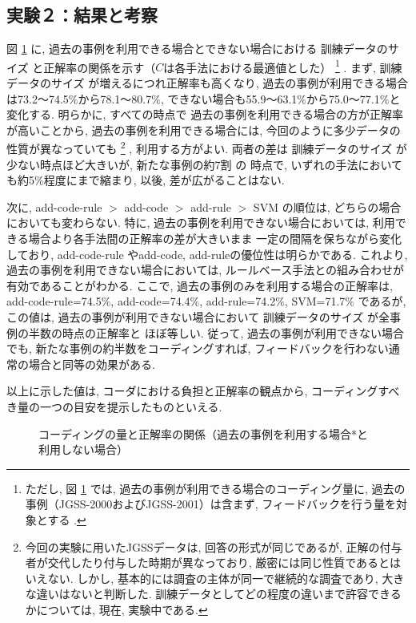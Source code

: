 \documentclass{nlp}
\begin{document}
\subsection{実験２：結果と考察} 
図
\ref{figure00010202}
に, 
過去の事例を利用できる場合とできない場合における 
訓練データのサイズ
と正解率の関係を示す（$C$は各手法における最適値とした）
\footnote{ただし, 
図
\ref{figure00010202}
では, 
過去の事例が利用できる場合のコーディング量に, 
過去の事例（JGSS-2000およびJGSS-2001）は含まず, 
フィードバックを行う量を対象とする
. }
. 
まず, 
訓練データのサイズ
が増えるにつれ正解率も高くなり, 
過去の事例が利用できる場合は73.2〜74.5$\%$から78.1〜80.7$\%$, 
できない場合も55.9〜63.1$\%$から75.0〜77.1$\%$と変化する. 
明らかに, すべての時点で
過去の事例を利用できる場合の方が正解率が高いことから, 
過去の事例を利用できる場合には, 
今回のように多少データの性質が異なっていても
\footnote{今回の実験に用いたJGSSデータは, 
回答の形式が同じであるが, 
正解の付与者が交代したり付与した時期が異なっており, 
厳密には同じ性質であるとはいえない. 
しかし, 基本的には調査の主体が同一で継続的な調査であり, 
大きな違いはないと判断した. 
訓練データとしてどの程度の違いまで許容できるかについては, 
現在, 実験中である. 
}
, 
利用する方がよい. 
両者の差は
訓練データのサイズ
が少ない時点ほど大きいが,  
新たな事例の約7割
の
時点で, 
いずれの手法においても約5$\%$程度にまで縮まり, 
以後, 差が広がることはない. 

次に, add-code-rule $>$ add-code $>$ add-rule $>$ SVM の順位は, 
どちらの場合においても変わらない. 
特に, 過去の事例を利用できない場合においては, 
利用できる場合より各手法間の正解率の差が大きいまま
一定の間隔を保ちながら変化しており, 
add-code-rule やadd-code, add-ruleの優位性は明らかである. 
これより,過去の事例を利用できない場合においては,  
ルールベース手法との組み合わせが有効であることがわかる. 
ここで,  
過去の事例のみを利用する場合の正解率は, 
add-code-rule=74.5$\%$, add-code=74.4$\%$, add-rule=74.2$\%$, SVM=71.7$\%$
であるが, 
この値は, 
過去の事例が利用できない場合において
訓練データのサイズ
が全事例の半数の時点の正解率と
ほぼ等しい. 
従って, 
過去の事例が利用できない場合でも, 
新たな事例の約半数をコーディングすれば, 
フィードバックを行わない通常の場合と同等の効果がある. 

以上に示した値は, コーダにおける負担と正解率の観点から, 
コーディングすべき量の一つの目安を提示したものといえる. 

\begin{figure}
\caption{コーディングの量と正解率の関係（過去の事例を利用する場合*と利用しない場合）}
\label{figure00010202}
\end{figure}
\end{document}
